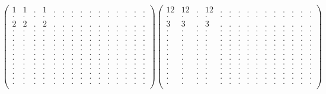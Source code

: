 \documentclass[12pt,a4paper]{amsart}
\begin{document}
\begin{align*}
\left(\begin{array}{rrrrrrrrrrrrrrr}%
1&1&.&1&.&.&.&.&.&.&.&.&.&.&.\\%
.&.&.&.&.&.&.&.&.&.&.&.&.&.&.\\%
2&2&.&2&.&.&.&.&.&.&.&.&.&.&.\\%
.&.&.&.&.&.&.&.&.&.&.&.&.&.&.\\%
.&.&.&.&.&.&.&.&.&.&.&.&.&.&.\\%
.&.&.&.&.&.&.&.&.&.&.&.&.&.&.\\%
.&.&.&.&.&.&.&.&.&.&.&.&.&.&.\\%
.&.&.&.&.&.&.&.&.&.&.&.&.&.&.\\%
.&.&.&.&.&.&.&.&.&.&.&.&.&.&.\\%
.&.&.&.&.&.&.&.&.&.&.&.&.&.&.\\%
.&.&.&.&.&.&.&.&.&.&.&.&.&.&.\\%
.&.&.&.&.&.&.&.&.&.&.&.&.&.&.\\%
.&.&.&.&.&.&.&.&.&.&.&.&.&.&.\\%
.&.&.&.&.&.&.&.&.&.&.&.&.&.&.\\%
.&.&.&.&.&.&.&.&.&.&.&.&.&.&.\\%
\end{array}\right)%
\left(\begin{array}{rrrrrrrrrrrrrrr}%
12&12&.&12&.&.&.&.&.&.&.&.&.&.&.\\%
.&.&.&.&.&.&.&.&.&.&.&.&.&.&.\\%
3&3&.&3&.&.&.&.&.&.&.&.&.&.&.\\%
.&.&.&.&.&.&.&.&.&.&.&.&.&.&.\\%
.&.&.&.&.&.&.&.&.&.&.&.&.&.&.\\%
.&.&.&.&.&.&.&.&.&.&.&.&.&.&.\\%
.&.&.&.&.&.&.&.&.&.&.&.&.&.&.\\%
.&.&.&.&.&.&.&.&.&.&.&.&.&.&.\\%
.&.&.&.&.&.&.&.&.&.&.&.&.&.&.\\%
.&.&.&.&.&.&.&.&.&.&.&.&.&.&.\\%
.&.&.&.&.&.&.&.&.&.&.&.&.&.&.\\%
.&.&.&.&.&.&.&.&.&.&.&.&.&.&.\\%
.&.&.&.&.&.&.&.&.&.&.&.&.&.&.\\%
.&.&.&.&.&.&.&.&.&.&.&.&.&.&.\\%
.&.&.&.&.&.&.&.&.&.&.&.&.&.&.\\%
\end{array}\right)%
\end{align*}
\end{document}
